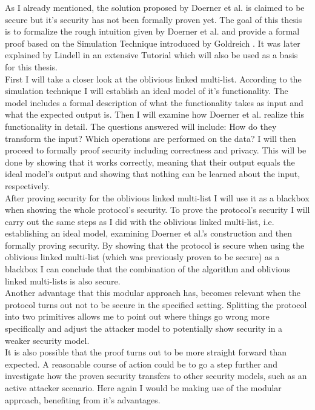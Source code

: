 As I already mentioned, the solution proposed by Doerner et al. is claimed to be secure but it's security has not been formally proven yet. The goal of this thesis is to formalize the rough intuition given by Doerner et al.  and provide a formal proof based on the Simulation Technique introduced by Goldreich . It was later explained by Lindell in an extensive Tutorial  which will also be used as a basis for this thesis.\\
First I will take a closer look at the oblivious linked multi-list. According to the simulation technique I will establish an ideal model of it's functionality. The model includes a formal description of what the functionality takes as input and what the expected output is. Then I will examine how Doerner et al. realize this functionality in detail. The questions answered will include: How do they transform the input? Which operations are performed on the data? I will then proceed to formally proof security including correctness and privacy. This will be done by showing that it works correctly, meaning that their output equals the ideal model's output and showing that nothing can be learned about the input, respectively.\\
After proving security for the oblivious linked multi-list I will use it as a blackbox when showing the whole protocol's security. To prove the protocol's security I will carry out the same steps as I did with the oblivious linked multi-list, i.e. establishing an ideal model, examining Doerner et al.'s construction and then formally proving security. By showing that the protocol is secure when using the oblivious linked multi-list (which was previously proven to be secure) as a blackbox I can conclude that the combination of the algorithm and oblivious linked multi-lists is also secure.\\
Another advantage that this modular approach has, becomes relevant when the protocol turns out not to be secure in the specified setting. Splitting the protocol into two primitives allows me to point out where things go wrong more specifically and adjust the attacker model to potentially show security in a weaker security model.\\
It is also possible that the proof turns out to be more straight forward than expected. A reasonable course of action could be to go a step further and investigate how the proven security transfers to other security models, such as an active attacker scenario. Here again I would be making use of the modular approach, benefiting from it's advantages.\\